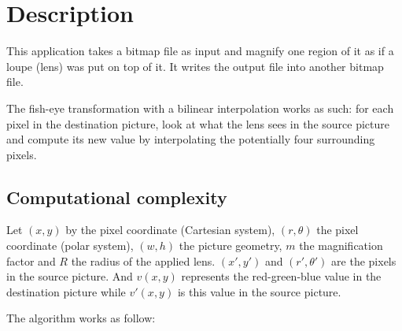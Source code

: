 \documentclass[10pt,a4paper]{article}
\begin{document}
\maketitle


\section{Description}

This application takes a bitmap file as input and magnify one region of it as
if a loupe (lens) was put on top of it. It writes the output file into another
bitmap file.

The fish-eye transformation with a bilinear interpolation works as such: for
each pixel in the destination picture, look at what the lens sees in the
source picture and compute its new value by interpolating the potentially four
surrounding pixels.

\subsection{Computational complexity}

Let $(x, y)$ by the pixel coordinate (Cartesian system), $(r, \theta)$ the
pixel coordinate (polar system), $(w, h)$ the picture geometry, $m$ the
magnification factor and $R$ the radius of the applied lens. $(x\prime,
y\prime)$ and $(r\prime, \theta\prime)$ are the pixels in the source picture.
And $v(x,y)$ represents the red-green-blue value in the destination picture
while $v\prime(x,y)$ is this value in the source picture.

The algorithm works as follow:
\end{document}
